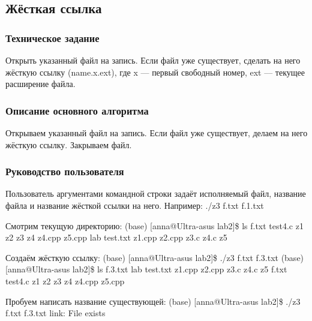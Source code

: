 \documentclass[a4paper,12pt]{extarticle}
\begin{document}
\subsection{Жёсткая ссылка}
\subsubsection{Техническое задание}
Открыть  указанный  файл  на  запись.  Если  файл  уже  существует,  сделать  на  него жёсткую  ссылку  (name.x.ext),  где  x --- первый  свободный  номер, ext –-- текущее расширение файла.

\subsubsection{Описание основного алгоритма}
Открываем  указанный  файл  на  запись.  Если  файл  уже  существует, делаем  на  него жёсткую  ссылку. Закрываем файл.

\subsubsection{Руководство пользователя}
Пользователь аргументами командной строки задаёт исполняемый файл, название файла и название жёсткой ссылки на него.\newline
Например: ./z3 f.txt f.1.txt\newline

Смотрим текущую директорию:\newline
(base) [anna@Ultra-asus lab2]\$ ls\newline
f.txt  test4.c   z1      z2      z3    z4    z4.cpp  z5.cpp\newline
lab    test.txt  z1.cpp  z2.cpp  z3.c  z4.c  z5\newline

Создаём жёсткую ссылку:\newline
(base) [anna@Ultra-asus lab2]\$ ./z3 f.txt f.3.txt\newline
(base) [anna@Ultra-asus lab2]\$ ls\newline
f.3.txt  lab      test.txt  z1.cpp  z2.cpp  z3.c  z4.c    z5\newline
f.txt    test4.c  z1        z2      z3      z4    z4.cpp  z5.cpp\newline

Пробуем написать название существующей:\newline
(base) [anna@Ultra-asus lab2]\$ ./z3 f.txt f.3.txt\newline
link: File exists\newline
\end{document}
